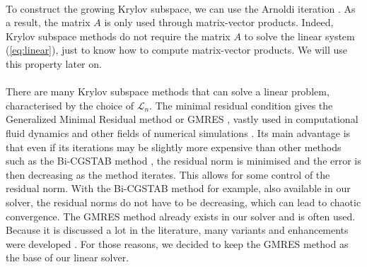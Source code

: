       \paragraph{}
      To construct the growing Krylov subspace, we can use the Arnoldi iteration \cite{TrefethenBau1997}.
      As a result, the matrix $A$ is only used through matrix-vector products.
      Indeed, Krylov subspace methods do not require the matrix $A$ to solve the linear system (\ref{eq:linear}), just to know how to compute matrix-vector products.
      We will use this property later on.

      \paragraph{}
      There are many Krylov subspace methods that can solve a linear problem, characterised by the choice of $\mathcal{L}_n$.
      The minimal residual condition gives the Generalized Minimal Residual method or GMRES \cite{SaadSchultz1986}, vastly used in computational fluid dynamics \cite{FrancoCamierAndrejEtAl2020} and other fields of numerical simulations \cite{ErnstGander2012, Mercier2015}.
      Its main advantage is that even if its iterations may be slightly more expensive than other methods such as the Bi-CGSTAB method \cite{Vorst1992, TrefethenBau1997}, the residual norm is minimised and the error is then decreasing as the method iterates.
      This allows for some control of the residual norm.
      With the Bi-CGSTAB method for example, also available in our solver, the residual norms do not have to be decreasing, which can lead to chaotic convergence.
      The GMRES method already exists in our solver and is often used.
      Because it is discussed a lot in the literature, many variants and enhancements were developed \cite{CoulaudGiraudRametEtAl2013, Vasseur2016, JolivetTournier2016}.
      For those reasons, we decided to keep the GMRES method as the base of our linear solver.

